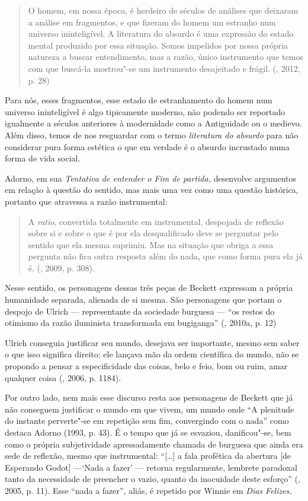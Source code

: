 {\begin{quote}
O homem, em nossa época, é herdeiro de séculos de análises que deixaram
a análise em fragmentos, e que fizeram do homem um estranho num universo
ininteligível. A literatura do absurdo é uma expressão do estado mental
produzido por essa situação. Somos impelidos por nossa própria natureza
a buscar entendimento, mas a razão, único instrumento que temos com que
buscá-la mostrou"-se um instrumento desajeitado e frágil. (, 2012, p.
28)
\end{quote}

Para nós, esses fragmentos, esse estado de estranhamento do homem num
universo ininteligível é algo tipicamente moderno, não podendo ser
reportado igualmente a séculos anteriores à modernidade como a
Antiguidade ou o medievo. Além disso, temos de nos resguardar com o
termo \emph{literatura do absurdo} para não considerar pura forma
estética o que em verdade é o absurdo incrustado numa forma de vida
social.

Adorno, em sua \emph{Tentativa de entender o Fim de partida,} desenvolve
argumentos em relação à questão do sentido, mas mais uma vez como uma
questão histórica, portanto que atravessa a razão instrumental:

\begin{quote}
A \emph{ratio}, convertida totalmente em instrumental, despojada de
reflexão sobre si e sobre o que é por ela desqualificado deve se
perguntar pelo sentido que ela mesma suprimiu. Mas na situação que
obriga a essa pergunta não fica outra resposta além do nada, que como
forma pura ela já é. (, 2009, p. 308).
\end{quote}

Nesse sentido, os personagens dessas três peças de Beckett expressam a
própria humanidade separada, alienada de si mesma. São personagens que
portam o despojo de Ulrich --- representante da sociedade burguesa ---
``os restos do otimismo da razão iluminista transformada em bugiganga''
(, 2010a, p. 12)

Ulrich conseguia justificar seu mundo, desejava ser importante, mesmo
sem saber o que isso significa direito; ele lançava mão da ordem
científica do mundo, não se propondo a pensar a especificidade das
coisas, belo e feio, bom ou ruim, amar qualquer coisa (, 2006, p.
1184).

Por outro lado, nem mais esse discurso resta aos personagens de Beckett
que já não conseguem justificar o mundo em que vivem, um mundo onde ``A
plenitude do instante perverte"-se em repetição sem fim, convergindo com
o nada'' como destaca Adorno (1993, p. 43). É o tempo que já se
esvaziou, danificou"-se, bem como o própria subjetividade apressadamente
chamada de burguesa que ainda era sede de reflexão, mesmo que
instrumental: ``[\ldots{}] a fala profética da abertura [de Esperando
Godot] ---`Nada a fazer' --- retorna regularmente, lembrete paradoxal
tanto da necessidade de preencher o vazio, quanto da inocuidade deste
esforço'' (, 2005, p. 11). Esse ``nada a fazer'', aliás, é
repetido por Winnie em \emph{Dias Felizes.}

}
